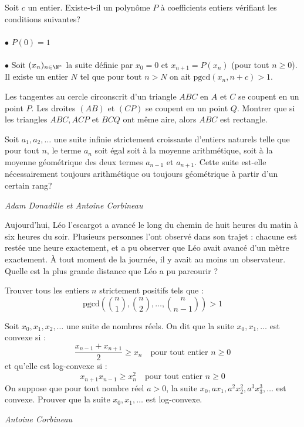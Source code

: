\begin{exo}{}
Soit $c$ un entier. Existe-t-il un polynôme $P$ à coefficients entiers vérifiant les conditions suivantes?\\~~\\
$\bullet$ $P(0)=1$\\~~\\
$\bullet$ Soit $(x_n)_{n\in \N^*}$ la suite définie par $x_0=0$ et $x_{n+1}=P(x_n)$ (pour tout $n\ge 0$). Il existe un entier $N$ tel que pour tout $n>N$ on ait $\text{pgcd}(x_n,n+c)>1$.
\end{exo}

\begin{exo}{}
Les tangentes au cercle circonscrit d'un triangle $ABC$ en $A$ et $C$ se coupent en un point $P$. Les droites $(AB)$ et $(CP)$ se coupent en un point $Q$. Montrer que si les triangles $ABC,ACP$ et $BCQ$ ont même aire, alors $ABC$ est rectangle.
\end{exo}

\begin{exo}{}Soit $a_1,a_2,\ldots$ une suite infinie strictement croissante d'entiers naturels telle que pour tout $n$, le terme $a_n$ soit égal soit à la moyenne arithmétique, soit à la moyenne géométrique des deux termes $a_{n-1}$ et $a_{n+1}$. Cette suite est-elle nécessairement toujours arithmétique ou toujours géométrique à partir d'un certain rang?

\medskip
\textit{Adam Donadille et Antoine Corbineau}
\end{exo}

\begin{exo}{}
Aujourd'hui, Léo l'escargot a avancé le long du chemin de huit heures du matin à six heures du soir. Plusieurs personnes l'ont observé dans son trajet : chacune est restée une heure exactement, et a pu observer que Léo avait avancé d'un mètre exactement. \`{A} tout moment de la journée, il y avait au moins un observateur. Quelle est la plus grande distance que Léo a pu parcourir ?
\end{exo}


\begin{exo}{}
Trouver tous les entiers $n$ strictement positifs tels que :
$$\text{pgcd}\left(\binom{n}{1},\binom{n}{2},\dots,\binom{n}{n-1}\right)>1$$

\end{exo}

\begin{exo}{}
Soit $x_0, x_1, x_2, \ldots $ une suite de nombres réels. On dit que la suite $x_0, x_1, \ldots$ est convexe si :
\[
\frac{x_{n-1}+x_{n+1}}{2}\geq x_n\quad \textrm {pour tout entier } n \geq 0
\]
et qu'elle est log-convexe si :
\[
x_{n+1}x_{n-1}\geq x_n^2\quad \textrm {pour tout entier } n \geq 0
\]
 On suppose que pour tout nombre réel $a>0$, la suite $x_0, a x_1, a^2 x_2^2, a^3 x_3^3, \ldots$ est convexe. Prouver que la suite $x_0, x_1, \ldots $ est log-convexe.

 \medskip
\textit{Antoine Corbineau}
\end{exo}



